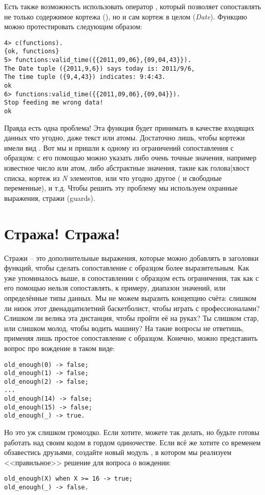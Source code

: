 Есть также возможность использовать оператор \ops{\strut=}, который позволяет сопоставлять не только содержимое кортежа (), но и сам кортеж в целом (\emph{Date}).
Функцию можно протестировать следующим образом:
\begin{lstlisting}[style=erlang]
4> c(functions).
{ok, functions}
5> functions:valid_time({{2011,09,06},{09,04,43}}).
The Date tuple ({2011,9,6}) says today is: 2011/9/6,
The time tuple ({9,4,43}) indicates: 9:4:43.
ok
6> functions:valid_time({{2011,09,06},{09,04}}).
Stop feeding me wrong data!
ok
\end{lstlisting}

Правда есть одна проблема!
Эта функция будет принимать в качестве входящих данных что угодно, даже текст или атомы.
Достаточно лишь, чтобы кортежи имели вид .
Вот мы и пришли к одному из ограничений сопоставления с образцом: с его помощью можно указать либо очень точные значения, например известное число или атом, либо абстрактные значения, такие как голова|хвост списка, кортеж из \emph{N} элементов, или что угодно другое (\ops{\strut\_} и свободные переменные), и т.д.
Чтобы решить эту проблему мы используем охранные выражения, стражи (guards). 
\section{Стража! Стража!}
Стражи \--- это дополнительные выражения, которые можно добавлять в заголовки функций, чтобы сделать сопоставление с образцом более выразительным.
Как уже упоминалось выше, в сопоставлении с образцом есть ограничения, так как с его помощью нельзя сопоставлять, к примеру, диапазон значений, или  определённые типы данных.
Мы не можем выразить концепцию счёта: слишком ли низок этот двенадцатилетний баскетболист, чтобы играть с профессионалами?
Слишком ли велика эта дистанция, чтобы пройти её на руках?
Ты слишком стар, или слишком молод, чтобы водить машину?
На такие вопросы не ответишь, применяя лишь простое сопоставление с образцом.
Конечно, можно представить вопрос про вождение в таком виде:
\begin{lstlisting}[style=erlang]
old_enough(0) -> false;
old_enough(1) -> false;
old_enough(2) -> false;
...
old_enough(14) -> false;
old_enough(15) -> false;
old_enough(_) -> true.
\end{lstlisting}

Но это уж слишком громоздко.
Если хотите, можете так делать, но будьте готовы работать над своим кодом в гордом одиночестве.
Если всё же хотите со временем обзавестись друзьями, создайте новый модуль , в котором мы реализуем <<правильное>> решение для вопроса о вождении:
\begin{lstlisting}[style=erlang]
old_enough(X) when X >= 16 -> true;
old_enough(_) -> false.
\end{lstlisting}

